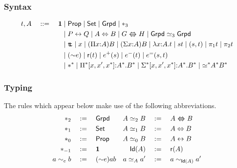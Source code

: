 \documentclass[12pt]{scrartcl}
\begin{document}
\pagestyle{empty}
\thispagestyle{empty}
\section*{\fbox{$\boldsymbol{\leqg}$}}
\subsubsection*{Syntax}
\begin{align*}
  t, A \quad ::= \quad \unitt &\mid \props \mid \sets \mid \grpds \mid
  \sta_3\\
&\mid P \lra Q \mid A \LRA B \mid G \gequiv H \mid \grpds \simeq_3 \grpds \\
&\mid \ttt \mid x \mid (\Pi x {:} A) B \mid (\Sigma x {:} A) B 
\mid \lambda x {:}A.t \mid s t \mid (s,t) \mid \pi_1 t \mid \pi_2 t \\
&\mid ({\sim}e) \mid \refl{t}\mid e^+(s) \mid e^-(t) \mid e^=(s,t)\\
&\mid \sta^{\sta} \mid \Pi^* [x,x',x^*] {:} A^*. B^*
\mid \Sigma^* [x,x',x^*] {:} A^*. B^*
\mid {\ee{}^*} A^* B^*
\end{align*}
\subsubsection*{Typing}
The rules which appear below make use of the following
abbreviations.
\begin{align*}
\sta_2 &\df \grpds &
A \simeq_2 B &\df A \gequiv B \\
\sta_1 &\df \sets &
A \simeq_1 B &\df A  \LRA B\\
\sta_0 &\df \props &
A \simeq_0 B &\df A \lra B\\
\sta_{-1} &\df \unitt &
\idof{A} &\df \refl{A}\\
 a \sim_e b &\df ({\sim} e) a b&
a \ee A a' &\df a \sim_{\idof{A}} a'\\
\end{align*}

\begin{prooftree}
\end{prooftree}
\end{document}
